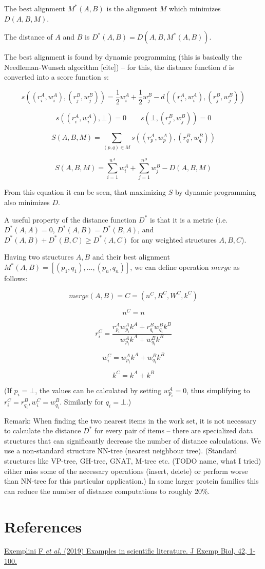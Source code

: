 \documentclass[12pt,draft]{article}
\begin{document}
The best alignment \(M^*(A, B)\) is the alignment \(M\) which minimizes
\(D(A, B, M)\).

The distance of \(A\) and \(B\) is \(D^*(A, B) = D(A, B, M^*(A, B))\).

The best alignment is found by dynamic programming (this is basically
the Needleman-Wunsch algorithm {[}cite{]}) -- for this, the distance
function \(d\) is converted into a score function \(s\):

\[s((r^A_i, w^A_i), (r^B_j, w^B_j)) = \frac{1}{2} w^A_i + \frac{1}{2} w^B_j - d((r^A_i, w^A_i), (r^B_j, w^B_j))\]

\[s((r^A_i, w^A_i), \bot) = 0 \qquad s(\bot, (r^B_j, w^B_j)) = 0\]

\[S(A, B, M) = \sum\limits_{(p, q) \in M}{s((r^A_{p}, w^A_{p}), (r^B_{q}, w^B_{q}))}\]

\[S(A, B, M) = \sum\limits_{i=1}^{n^A}{w^A_i} + \sum\limits_{j=1}^{n^B}{w^B_j} - D(A, B, M)\]

From this equation it can be seen, that maximizing \(S\) by dynamic
programming also minimizes \(D\).

A useful property of the distance function \(D^*\) is that it is a
metric (i.e.~\(D^*(A,A) = 0\), \(D^*(A,B) = D^*(B,A)\), and
\(D^*(A,B) + D^*(B,C) \geq D^*(A,C)\) for any weighted structures
\(A, B, C\)).

Having two structures \(A, B\) and their best alignment
\(M^*(A, B) = [(p_1, q_1), ..., (p_n, q_n)]\), we can define operation
\(merge\) as follows:

\[merge(A, B) = C = (n^C, R^C, W^C, k^C)\]

\[n^C = n\]

\[r^C_i = \frac {r^A_{p_i} w^A_{p_i} k^A + r^B_{q_i} w^B_{q_i} k^B} {w^A_{p_i} k^A + w^B_{q_i} k^B}\]

\[w^C_i = w^A_{p_i} k^A + w^B_{q_i} k^B\]

\[k^C = k^A + k^B\]

(If \(p_i=\bot\), the values can be calculated by setting
\(w^A_{p_i} = 0\), thus simplifying to
\(r^C_i = r^B_{q_i}, w^C_i = w^B_{q_i}\). Similarly for \(q_i=\bot\).)

Remark: When finding the two nearest items in the work set, it is not
necessary to calculate the distance \(D^*\) for every pair of items --
there are specialized data structures that can significantly decrease
the number of distance calculations. We use a non-standard structure
NN-tree (nearest neighbour tree). (Standard structures like VP-tree,
GH-tree, GNAT, M-tree etc. (TODO name, what I tried) either miss some of
the necessary operations (insert, delete) or perform worse than NN-tree
for this particular application.) In some larger protein families this
can reduce the number of distance computations to roughly 20\%.

\hypertarget{references}{%
\section{References}\label{references}}

\href{http://example.com/}{Exemplini F \emph{et al.} (2019) Examples in
scientific literature. J Exemp Biol, 42, 1-100.}
\end{document}
